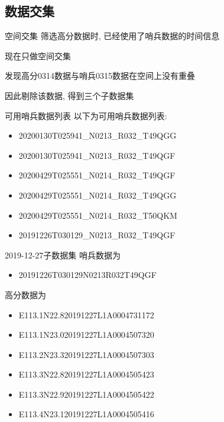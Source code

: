 \subsection{数据交集}
\begin{frame}{空间交集}
    筛选高分数据时, 已经使用了哨兵数据的时间信息

    现在只做空间交集

    发现高分0314数据与哨兵0315数据在空间上没有重叠

    因此剔除该数据, 得到三个子数据集
\end{frame}

\begin{frame}{可用哨兵数据列表}
    \small
    以下为可用哨兵数据列表:
    \begin{itemize}
        \item 20200130T025941\_N0213\_R032\_T49QGG 
        \item 20200130T025941\_N0213\_R032\_T49QGF
        \item 20200429T025551\_N0214\_R032\_T49QGF
        \item 20200429T025551\_N0214\_R032\_T49QGG
        \item 20200429T025551\_N0214\_R032\_T50QKM
        \item 20191226T030129\_N0213\_R032\_T49QGF
    \end{itemize}
\end{frame}

\begin{frame}{2019-12-27子数据集}
    \small 哨兵数据为
    \tiny
    \begin{itemize}
        \item 20191226T030129N0213R032T49QGF
    \end{itemize}
    \small 高分数据为
    \tiny
    \begin{itemize}
        \item E113.1N22.820191227L1A0004731172
        \item E113.1N23.020191227L1A0004507320
        \item E113.2N23.320191227L1A0004507303
        \item E113.3N22.820191227L1A0004505423
        \item E113.3N22.920191227L1A0004505422
        \item E113.4N23.120191227L1A0004505416
    \end{itemize}
\end{frame}

